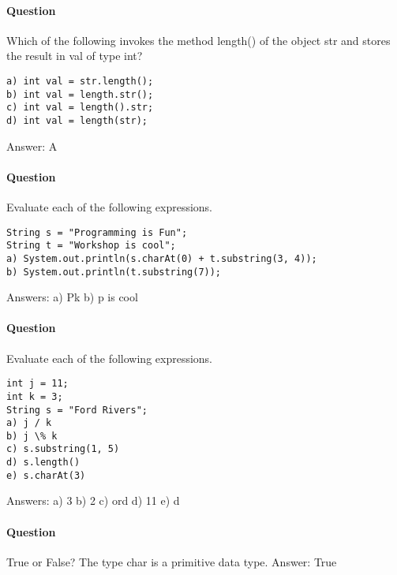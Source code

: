 \documentclass{article}
\begin{document}
\addtocounter{question_num}{1}
\paragraph{Question }
Which of the following invokes the method length() of the object str and stores the result in val of type int?
\begin{lstlisting}
a) int val = str.length();
b) int val = length.str();
c) int val = length().str;
d) int val = length(str);
\end{lstlisting}
{\color{red}Answer: A}

\addtocounter{question_num}{1}
\paragraph{Question }
Evaluate each of the following expressions.
\begin{lstlisting}
String s = "Programming is Fun";
String t = "Workshop is cool";
a) System.out.println(s.charAt(0) + t.substring(3, 4));
b) System.out.println(t.substring(7));
\end{lstlisting}
{\color{red}Answers:
\newline a) Pk
\newline b) p is cool}

\addtocounter{question_num}{1}
\paragraph{Question }
Evaluate each of the following expressions.
\begin{lstlisting}
int j = 11;
int k = 3;
String s = "Ford Rivers";
a) j / k
b) j \% k
c) s.substring(1, 5)
d) s.length()
e) s.charAt(3)
\end{lstlisting}
{\color{red}Answers:
\newline a) 3
\newline b) 2
\newline c) ord
\newline d) 11
\newline e) d
}

\addtocounter{question_num}{1}
\paragraph{Question }
True or False? The type char is a primitive data type.
{\color{red}Answer: True}

\addtocounter{question_num}{1}
\end{document}
